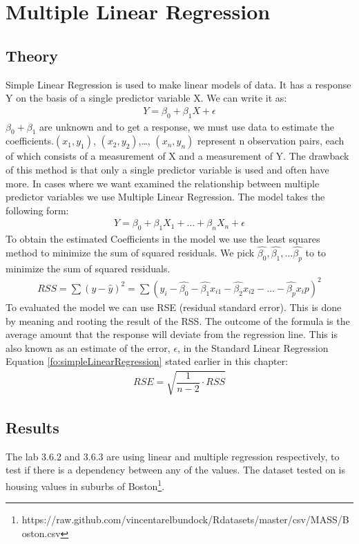 \section{Multiple Linear Regression}\label{sc:multipleLinearRegression}

\subsection{Theory}
Simple Linear Regression is used to make linear models of data. It has a response Y on the basis of a single predictor variable X. We can write it as:
\begin{align}\label{fo:simpleLinearRegression}
Y = \beta_0 + \beta_1 X + \epsilon
\end{align}
$ \beta_0 + \beta_1 $ are unknown and to get a response, we must use data to estimate the coefficients.$(x_1, y_1)$, $(x_2, y_2)$,\dots, $(x_n, y_n)$ represent n observation pairs, each of which consists of a measurement of X and a measurement of Y. The drawback of this method is that only a single predictor variable is used and often have more.
 In cases where we want examined the relationship between multiple predictor variables we use Multiple Linear Regression. The model takes the following form:
\begin{align}\label{fo:multipleLinearRegression}
Y = \beta_0 + \beta_1 X_1 + \ldots + \beta_n X_n + \epsilon
\end{align}
To obtain the estimated Coefficients in the model we use the least squares method to minimize the sum of squared residuals. We pick $\hat{\beta_0}, \hat{\beta_1}, ... \hat{\beta_p}$ to to minimize the sum of squared residuals.
\begin{align}\label{fo:rss}
RSS = \sum (y - \hat{y})^2 = \sum( y_i - \hat{\beta_0} - \hat{\beta_1}x_{i1} - \hat{\beta_2}x_{i2} - \ldots - \hat{\beta_p}x_\textit{i}p )^2
\end{align}
To evaluated the model we can use RSE (residual standard error). This is done by meaning and rooting the result of the RSS. The outcome of the formula is the average amount that the response will deviate from the regression line. This is also known as an estimate of the error, $\epsilon$, in the Standard Linear Regression Equation \ref{fo:simpleLinearRegression} stated earlier in this chapter:
\begin{align}\label{fo:rse}
RSE = \sqrt{\dfrac{1}{n-2}\cdot RSS}
\end{align}


\subsection{Results}
The lab 3.6.2 and 3.6.3 are using linear and multiple regression respectively, to test if there is a dependency between any of the values. The dataset tested on is housing values in suburbs of Boston\footnote{https://raw.github.com/vincentarelbundock/Rdatasets/master/csv/MASS/Boston.csv}.

